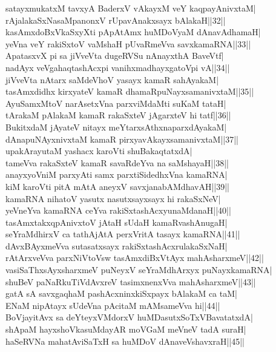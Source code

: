 \documentclass{article}
\begin{document}
satayxmukatxM tavxyA BaderxV vAkayxM veY kaqpayAnivxtaM|\\
rAjalakaSxNasaMpanonxV rUpavAnakxsayx bAlakaH||32||\\
kasAmxdoBxVkaSxyXti pApAtAmx huMDoVyaM dAnavAdhamaH|\\
yeVna veY rakiSxtoV vaMshaH pUvaRmeVva savxkamaRNA||33||\\
ApatasxvX pi sa jiVveVta dugeRVSu nAnayxthA BaveVtf|\\
nadAyx veVgahaqtashAcxpi vanihxmadhayxgatoVpi vA||34||\\
jiVveVta nAtarx saMdeVhoV yasayx kamaR sahAyakaM|\\
tasAmxdidhx kirxyateV kamaR dhamaRpuNayxsamanivxtaM||35||\\
AyuSamxMtoV narAsetxVna parxviMdaMti suKaM tataH|\\
tArakaM pAlakaM kamaR rakaSxteV jAgarxteV hi tatf||36||\\
BukitxdaM jAyateV nitayx meYtarxsAthxnaparxdAyakaM|\\
dAnapuNAyxnivxtaM kamaR pirxyavAkayxsamanivxtaM||37||\\
upakArayutaM yashacx karoVti shuBakaqtatxdA|\\
tameVva rakaSxteV kamaR savaRdeYva na saMshayaH||38||\\
anayxyoVniM parxyAti samx parxtiSidedhxVna kamaRNA|\\
kiM karoVti pitA mAtA aneyxV savxjanabAMdhavAH||39||\\
kamaRNA nihatoV yasutx nasutxsayxsayx hi rakaSxNeV|\\
yeVneYva kamaRNA ceYva rakiSxtashAcxyunaMdanaH||40||\\
tasAmxtakxqpAnivxtoV jAtaH sUdaH kamaRvashAnugaH|\\
seYraMdhirxV ca tathAjAtA perxVritA tasayx kamaRNA||41||\\
dAvxBAyxmeVva sutasatxsayx rakiSxtashAcxrulakaSxNaH|\\
rAtArxveVva parxNiVtoVsw tasAmxdiBxVtAyx mahAsharxmeV||42||\\
vasiSaThxsAyxsharxmeV puNeyxV seYraMdhArxyx puNayxkamaRNA|\\
shuBeV paNaRkuTiVdAvxreV tasimxnenxVva mahAsharxmeV||43||\\
gatA sA savxgaqhaM pashAcxninxkiSxpayx bAlakaM ca taM|\\
ENaM nipAtayx sUdeVna pAcitaM mAMsameVva hi||44||\\
BoVjayitAvx sa deYteyxVMdorxV huMDasutxSoTxVBavatatxdA|\\
shApaM hayxshoVkasuMdayAR moVGaM meVneV tadA suraH|\\
haSeRVNa mahatAviSaTxH sa huMDoV dAnaveVshavxraH||45||\\
\end{document}
